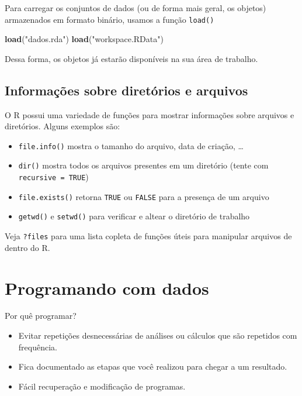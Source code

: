 \documentclass[10pt,a4paper]{book}
\newenvironment{Shaded}{\begin{snugshade}}{\end{snugshade}}
\newcommand{\KeywordTok}[1]{\textcolor[rgb]{0.13,0.29,0.53}{\textbf{#1}}}
\newcommand{\StringTok}[1]{\textcolor[rgb]{0.31,0.60,0.02}{#1}}
\newcommand{\NormalTok}[1]{#1}
\providecommand{\tightlist}{%
  \setlength{\itemsep}{0pt}\setlength{\parskip}{0pt}}
\begin{document}
Para carregar os conjuntos de dados (ou de forma mais geral, os objetos)
armazenados em formato binário, usamos a função \texttt{load()}

\begin{Shaded}
\begin{Highlighting}[]
\KeywordTok{load}\NormalTok{(}\StringTok{"dados.rda"}\NormalTok{)}
\KeywordTok{load}\NormalTok{(}\StringTok{"workspace.RData"}\NormalTok{)}
\end{Highlighting}
\end{Shaded}

Dessa forma, os objetos já estarão disponíveis na sua área de trabalho.

\section{Informações sobre diretórios e
arquivos}\label{informacoes-sobre-diretorios-e-arquivos}

O R possui uma variedade de funções para mostrar informações sobre
arquivos e diretórios. Alguns exemplos são:

\begin{itemize}
\tightlist
\item
  \texttt{file.info()} mostra o tamanho do arquivo, data de criação,
  \ldots{}
\item
  \texttt{dir()} mostra todos os arquivos presentes em um diretório
  (tente com \texttt{recursive\ =\ TRUE})
\item
  \texttt{file.exists()} retorna \texttt{TRUE} ou \texttt{FALSE} para a
  presença de um arquivo
\item
  \texttt{getwd()} e \texttt{setwd()} para verificar e altear o
  diretório de trabalho
\end{itemize}

Veja \texttt{?files} para uma lista copleta de funções úteis para
manipular arquivos de dentro do R.

\chapter{Programando com dados}\label{programando-com-dados}

Por quê programar?

\begin{itemize}
\tightlist
\item
  Evitar repetições desnecessárias de análises ou cálculos que são
  repetidos com frequência.
\item
  Fica documentado as etapas que você realizou para chegar a um
  resultado.
\item
  Fácil recuperação e modificação de programas.
\end{itemize}
\end{document}
